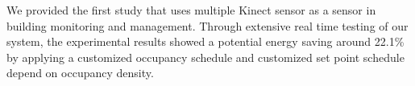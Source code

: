 We provided the first study that uses multiple Kinect sensor as a sensor in building monitoring and management. Through extensive real time testing of our system, the experimental results showed a potential energy saving around 22.1\% by applying a customized occupancy schedule and customized set point schedule depend on occupancy density. 